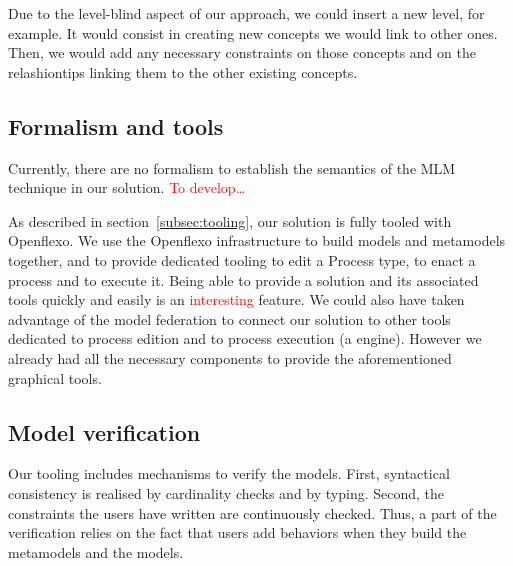   Due to the level-blind aspect of our approach, we could insert a new level,
  for example. It would consist in creating new concepts we would link to
  other ones. Then, we would add any necessary constraints on those concepts
  and on the relashiontips linking them to the other existing concepts. 



  
\subsection{Formalism and tools}



Currently, there are no formalism to establish the semantics of the MLM
technique in our solution. \textcolor{red}{To develop…}

As described in section~\ref{subsec:tooling}, our solution is fully tooled with Openflexo.
We use the Openflexo infrastructure to build models and metamodels together, and to provide 
dedicated tooling to edit a Process type, to enact a process and to execute it. Being able to provide a solution and its associated tools quickly and easily is an \textcolor{red}{interesting} feature. 
We could also have taken advantage of the model federation to connect our solution to other tools 
dedicated to process edition and to process execution (\eg a \BPMN engine). However we 
already had all the necessary components to provide the aforementioned graphical tools.

\subsection{Model verification}


Our tooling includes mechanisms to verify the models. First, syntactical consistency is realised by cardinality checks and by typing. Second, the constraints the users have written are continuously checked. Thus, a part of the verification relies on the fact that users add behaviors when they build the metamodels and the models.
